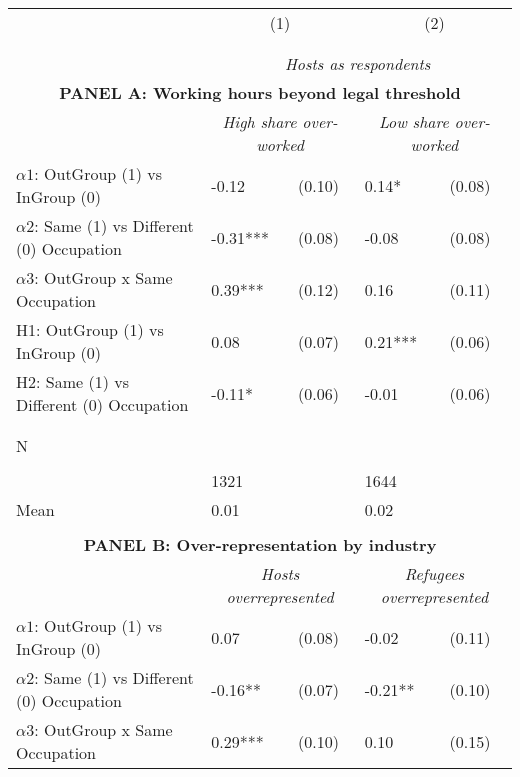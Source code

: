 \begin{tabular}{l*{4}{l}} \toprule 
                &\multicolumn{2}{c}{(1)}&\multicolumn{2}{c}{(2)}\\
                &\multicolumn{2}{c}{ } &\multicolumn{2}{c}{ } \\
\\[-0.6cm] & \multicolumn{4}{c}{\textit{Hosts as respondents}}  \\ \midrule \multicolumn{5}{c}{\textbf{PANEL A: Working hours beyond legal threshold}} \\ & \multicolumn{2}{c}{\textit{High share over-worked}} & \multicolumn{2}{c}{\textit{Low share over-worked}}   \\  \midrule  
$\alpha1$: OutGroup (1) vs InGroup (0)&    -0.12   &   (0.10)&     0.14*  &   (0.08)\\
$\alpha2$: Same (1) vs Different (0) Occupation&    -0.31***&   (0.08)&    -0.08   &   (0.08)\\
 
$\alpha3$: OutGroup x Same Occupation&     0.39***&   (0.12)&     0.16   &   (0.11)\\
 
H1: OutGroup (1) vs InGroup (0)&     0.08   &   (0.07)&     0.21***&   (0.06)\\
 
H2: Same (1) vs Different (0) Occupation&    -0.11*  &   (0.06)&    -0.01   &   (0.06)\\
 
  \\\\[-0.5cm] N \\\\[-0.6cm]&     1321   &         &     1644   &         \\
Mean            &     0.01&         &     0.02&         \\
 
 \\ \midrule \multicolumn{5}{c}{\textbf{PANEL B: Over-representation by industry}} \\ & \multicolumn{2}{c}{\textit{Hosts overrepresented}} & \multicolumn{2}{c}{\textit{Refugees overrepresented}}   \\  \midrule  
$\alpha1$: OutGroup (1) vs InGroup (0)&     0.07   &   (0.08)&    -0.02   &   (0.11)\\
$\alpha2$: Same (1) vs Different (0) Occupation&    -0.16** &   (0.07)&    -0.21** &   (0.10)\\
 
$\alpha3$: OutGroup x Same Occupation&     0.29***&   (0.10)&     0.10   &   (0.15)\\
 

\end{tabular}

